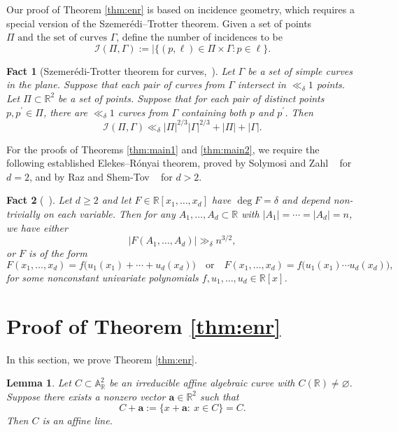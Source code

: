 \documentclass[12pt,reqno]{amsart}
\numberwithin{equation}{section}
\newtheorem{fact}{Fact}[section]
\newtheorem{lemma}[theorem]{Lemma}
\begin{document}
Our proof of Theorem \ref{thm:enr} is based on incidence geometry, which requires a special version of the Szemer\'{e}di–Trotter theorem. Given a set of points $ \Pi \text { and the set of curves } \Gamma$, define the number of incidences to be 
$$\mathcal{I}(\Pi, \Gamma):=|\{(p, \ell) \in \Pi\times \Gamma: p \in \ell\}.$$
\begin{fact}[Szemer\'{e}di-Trotter theorem for curves,~\cite{pach1998number}]\label{fact:sze} Let $\Gamma$ be a set of simple curves in the plane. Suppose that each pair of curves from $\Gamma$ intersect in $\ll_{\delta} 1$ points. Let $\Pi \subset \mathbb{R}^2$ be a set of points. Suppose that for each pair of distinct points $p, p^{\prime} \in \Pi$, there are $\ll_{\delta} 1$ curves from $\Gamma$ containing both $p$ and $p^{\prime}$. Then
$$
\mathcal{I}(\Pi, \Gamma) \ll_{\delta }|\Pi|^{2 / 3}|\Gamma|^{2 / 3}+|\Pi|+|\Gamma|.
$$

\end{fact}

For the proofs of Theorems \ref{thm:main1} and \ref{thm:main2}, we require the following established Elekes--R\'{o}nyai theorem, proved by Solymosi and Zahl ~\cite{solymosi2024improved} for $d=2$, and by Raz and Shem-Tov ~\cite{raz2020expanding}  for $d>2$.

\begin{fact}[~\cite{raz2020expanding,solymosi2024improved}]\label{thm:er}
Let $d\ge 2$ and let $F\in\mathbb R[x_1,\ldots,x_d]$ have $\deg F=\delta$ and depend non-trivially on each variable.
Then for any $A_1,\ldots, A_d\subset \mathbb{R}$ with $|A_1|=\cdots=|A_d|=n $, we have either
\[ 
|F(A_1,\ldots,A_d)|\gg_\delta n^{3/2},
\]
 or $F$ is of the form
\[
F(x_1,\ldots,x_d)=f\big(u_1(x_1)+\cdots+u_d(x_d)\big)
\quad\text{or}\quad
F(x_1,\ldots,x_d)=f\big(u_1(x_1)\cdots u_d(x_d)\big),
\]
for some nonconstant univariate polynomials $f,u_1,\ldots,u_d\in\mathbb R[x]$.
\end{fact}




\section{Proof of Theorem \ref{thm:enr} }
In this section, we prove Theorem \ref{thm:enr}. 


\begin{lemma}\label{lem:translation}
Let $C\subset \mathbb{A}^2_{\mathbb{R}}$ be an irreducible affine algebraic curve with $C(\mathbb{R})\neq\varnothing$.
Suppose there exists a nonzero vector $\mathbf a\in \mathbb{R}^2$ such that
\[
C+\mathbf a := \{x+\mathbf a:\ x\in C\}=C .
\]
Then $C$ is an affine line.
\end{lemma}
\end{document}
